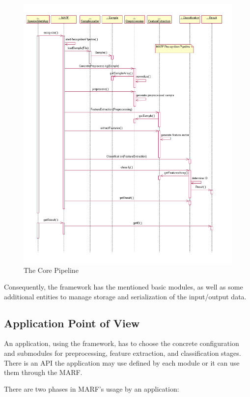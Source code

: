 \begin{figure}
	\centering
	\includegraphics[angle=90,totalheight=660pt,width=550pt]{../graphics/arch/pipeline.png}
	\caption{The Core Pipeline}
	\label{fig:pipeline}
\end{figure}

Consequently, the framework has the mentioned basic modules,
as well as some additional entities to manage storage
and serialization of the input/output data.

\subsection{Application Point of View}

An application, using the framework, has to choose
the concrete configuration and submodules for preprocessing,
feature extraction, and classification stages. There is an API the application
may use defined by each module or it can use them through the MARF.

There are two phases in MARF's usage by an application:

